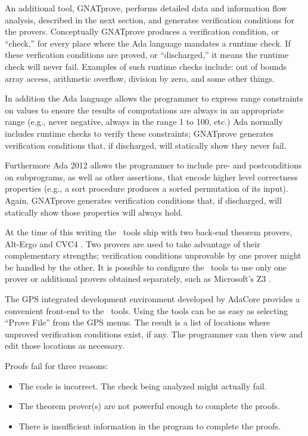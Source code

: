 An additional tool, GNATprove, performs detailed data and information flow analysis, described
in the next section, and generates verification conditions for the provers. Conceptually
GNATprove produces a verification condition, or ``check,'' for every place where the Ada
language mandates a runtime check. If these verfication conditions are proved, or
``discharged,'' it means the runtime check will never fail. Examples of such runtime checks
include: out of bounds array access, arithmetic overflow, division by zero, and some other
things.

In addition the Ada language allows the programmer to express range constraints on values to
ensure the results of computations are always in an appropriate range (e.g., never negative,
always in the range 1 to 100, etc.) Ada normally includes runtime checks to verify these
constraints; GNATprove generates verification conditions that, if discharged, will statically
show they never fail.

Furthermore Ada 2012 allows the programmer to include pre- and postconditions on subprograms, as
well as other assertions, that encode higher level correctness properties (e.g., a sort
procedure produces a sorted permutation of its input). Again, GNATprove generates verification
conditions that, if discharged, will statically show those properties will always hold.

At the time of this writing the \SPARK\ tools ship with two back-end theorem provers, Alt-Ergo
\cite{alt-ergo} and CVC4 \cite{barrett2011}. Two provers are used to take advantage of their
complementary strengths; verification conditions unprovable by one prover might be handled by
the other. It is possible to configure the \SPARK\ tools to use only one prover or additional
provers obtained separately, such as Microsoft's Z3 \cite{Moura2008}.

The GPS integrated development environment developed by AdaCore provides a convenient front-end
to the \SPARK\ tools. Using the tools can be as easy as selecting ``Prove File'' from the GPS
menus. The result is a list of locations where unproved verification conditions exist, if any.
The programmer can then view and edit those locations as necessary.

Proofs fail for three reasons:
\begin{itemize}
\item The code is incorrect. The check being analyzed might actually fail.
\item The theorem prover(s) are not powerful enough to complete the proofs.
\item There is insufficient information in the program to complete the proofs.
\end{itemize}

